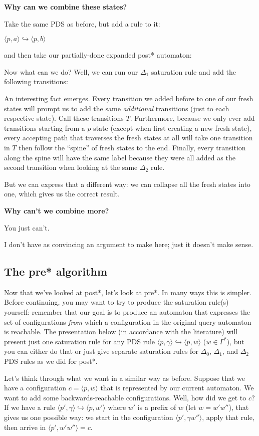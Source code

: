 \documentclass{article}
\newcommand{\Config}[2]{\ensuremath{\langle #1, #2 \rangle}}
\newcommand{\Rule}[2]{\ensuremath{#1 \hookrightarrow #2}}
\newcommand{\subsubsubsection}[1]{\textbf{#1}}
\begin{document}
\subsubsubsection{Why can we combine these states?}

Take the same PDS as before, but add a rule to it:

    \Rule{\Config{p}{a}}{\Config{p}{b}}

and then take our partially-done expanded post* automaton:

Now what can we do? Well, we can run our $\Delta_1$ saturation rule
and add the following transitions:


An interesting fact emerges. Every transition we added before to one
of our fresh states will prompt us to add the same \emph{additional}
transitions (just to each respective state). Call these transitions
$T$.  Furthermore, because we only ever add transitions starting from
a $p$ state (except when first creating a new fresh state), every
accepting path that traverses the fresh states at all will take one
transition in $T$ then follow the ``spine'' of fresh states to the
end. Finally, every transition along the spine will have the same
label because they were all added as the second transition when
looking at the same $\Delta_2$ rule.

But we can express that a different way: we can collapse all the fresh
states into one, which gives us the correct result.

\subsubsubsection{Why can't we combine more?}

You just can't.

I don't have as convincing an argument to make here; just it doesn't
make sense.


\subsection{The pre* algorithm}

Now that we've looked at post*, let's look at pre*. In many ways this
is simpler. Before continuing, you may want to try to produce the
saturation rule(s) yourself: remember that our goal is to produce an
automaton that expresses the set of configurations \emph{from} which a
configuration in the original query automaton is reachable. The
presentation below (in accordance with the literature) will present
just one saturation rule for any PDS rule
\Rule{\Config{p}{\gamma}}{\Config{p}{w}} ($w \in \Gamma^*$), but you
can either do that or just give separate saturation rules for $\Delta_0$,
$\Delta_1$, and $\Delta_2$ PDS rules as we did for post*.

Let's think through what we want in a similar way as before. Suppose
that we have a configuration $c = \Config{p}{w}$ that is
represented by our current automaton. We want to add some
backwards-reachable configurations. Well, how did we get to $c$? If we
have a rule \Rule{\Config{p'}{\gamma}}{\Config{p}{w'}} where $w'$ is a
prefix of $w$ (let $w = w'w''$), that gives us one possible way: we
start in the configuration \Config{p'}{\gamma w''}, apply that rule,
then arrive in $\Config{p'}{w'w''} = c$.
\end{document}
